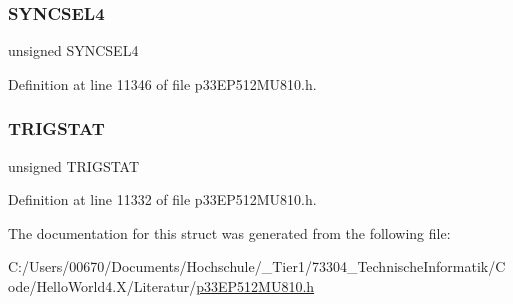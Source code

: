 \subsubsection{\texorpdfstring{S\+Y\+N\+C\+S\+E\+L4}{SYNCSEL4}}
{\footnotesize\ttfamily unsigned S\+Y\+N\+C\+S\+E\+L4}



Definition at line 11346 of file p33\+E\+P512\+M\+U810.\+h.

\mbox{\label{structtag_o_c4_c_o_n2_b_i_t_s_ab379549de54ac93ad4aa73686c34cb7c}} 
\subsubsection{\texorpdfstring{T\+R\+I\+G\+S\+T\+AT}{TRIGSTAT}}
{\footnotesize\ttfamily unsigned T\+R\+I\+G\+S\+T\+AT}



Definition at line 11332 of file p33\+E\+P512\+M\+U810.\+h.



The documentation for this struct was generated from the following file\+:\begin{DoxyCompactItemize}
\item 
C\+:/\+Users/00670/\+Documents/\+Hochschule/\+\_\+\+Tier1/73304\+\_\+\+Technische\+Informatik/\+Code/\+Hello\+World4.\+X/\+Literatur/\hyperlink{p33_e_p512_m_u810_8h}{p33\+E\+P512\+M\+U810.\+h}\end{DoxyCompactItemize}
